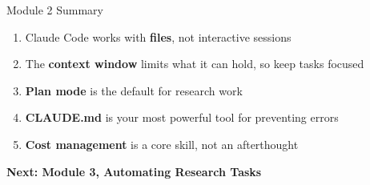 \documentclass[aspectratio=169, 11pt]{beamer}
\begin{document}

\begin{frame}{Module 2 Summary}
  \begin{enumerate}
    \item Claude Code works with \textbf{files}, not interactive sessions
    \item The \textbf{context window} limits what it can hold, so keep tasks focused
    \item \textbf{Plan mode} is the default for research work
    \item \textbf{CLAUDE.md} is your most powerful tool for preventing errors
    \item \textbf{Cost management} is a core skill, not an afterthought
  \end{enumerate}

  \vspace{1em}
  \centering
  \textbf{Next: Module 3, Automating Research Tasks}
\end{frame}
\end{document}

